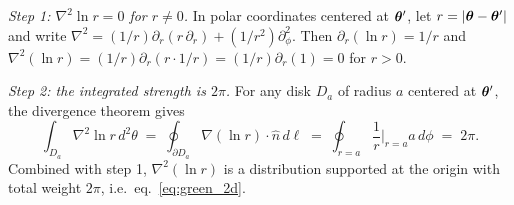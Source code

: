 \textit{Step 1: $\nabla^2 \ln r = 0$ for $r \neq 0$.}
In polar coordinates centered at $\boldsymbol{\theta}'$, let $r = |\boldsymbol{\theta} -
\boldsymbol{\theta}'|$ and write $\nabla^2 = (1/r)\partial_r(r\,\partial_r) +
(1/r^2)\partial_\phi^2$.  Then
$\partial_r(\ln r) = 1/r$ and
$\nabla^2(\ln r) = (1/r)\partial_r(r\cdot 1/r) = (1/r)\partial_r(1)
= 0$ for $r > 0$.

\textit{Step 2: the integrated strength is $2\pi$.}
For any disk $D_a$ of radius $a$ centered at $\boldsymbol{\theta}'$, the
divergence theorem gives
\begin{equation*}
    \int_{D_a}\nabla^2 \ln r\,d^2\theta
    \;=\; \oint_{\partial D_a} \nabla(\ln r)\cdot\hat{n}\,d\ell
    \;=\; \oint_{r=a}\!\!\frac{1}{r}\Bigg|_{r=a}\!a\,d\phi
    \;=\; 2\pi.
\end{equation*}
Combined with step 1, $\nabla^2(\ln r)$ is a distribution supported
at the origin with total weight $2\pi$, i.e.\
eq.~\eqref{eq:green_2d}.

